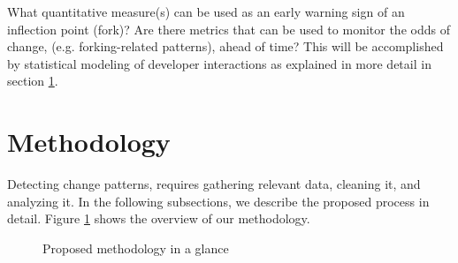 \documentclass[11pt]{report}
\begin{document}
What quantitative measure(s) can be used as an early warning sign of an inflection point (fork)? Are there metrics that can be used to monitor the odds of change, (e.g. forking-related patterns), ahead of time? This will be accomplished by statistical modeling of developer interactions as explained in more detail in section \ref{methodology}.

%
%

\pagebreak

\section{Methodology}
\label{methodology}

Detecting change patterns, requires gathering  relevant data, cleaning it, and analyzing it. In the following subsections, we describe the proposed process in detail. Figure \ref{FlowChart} shows the overview of our methodology.

\begin{figure}[!ht]
\centering
{}
\caption{Proposed methodology in a glance}
\label{FlowChart}
\end{figure}

%
\end{document}
